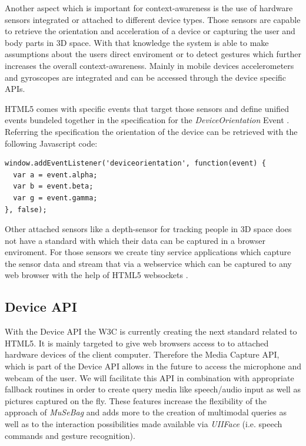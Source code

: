\documentclass[runningheads,a4paper]{llncs} \usepackage[utf8]{inputenc}
\begin{document}
Another aspect which is important for context-awareness is the use of
hardware sensors integrated or attached to different device types. 
Those sensors are capable to retrieve the orientation and
acceleration of a device or capturing the user and body parts in 3D space.
With that knowledge the system is able to make assumptions about the users
direct enviroment or to detect gestures which further increases the overall
context-awareness. 
Mainly in mobile devices accelerometers and gyroscopes are integrated and can be
accessed through the device specific APIs.

HTML5 comes with specific events that target those sensors and define unified
events bundeled together in the specification for the \emph{DeviceOrientation}
Event \cite{deviceOrientation}. Referring the specification the orientation of
the device can be retrieved with the following Javascript code:
\begin{lstlisting}
window.addEventListener('deviceorientation', function(event) {
  var a = event.alpha;
  var b = event.beta;
  var g = event.gamma;
}, false);
\end{lstlisting}

Other attached sensors like a depth-sensor for tracking people in 3D space
does not have a standard with which their data can be captured in a browser
enviroment. For those sensors we create tiny service applications which capture
the sensor data and stream that via a webservice which can be captured to any
web browser with the help of HTML5 websockets \cite{websockets}.

\subsection{Device API}

With the Device API \cite{deviceAPI} the W3C is currently creating the next
standard related to HTML5. It is mainly targeted to give web browsers access to
to attached hardware devices of the client computer. Therefore
the Media Capture API, which is part of the Device API allows in the future
to access the microphone and webcam of the user. 
We will facilitate this API in combination with appropriate fallback routines
in order to create query media like speech/audio input as well as pictures
captured on the fly. These features increase the flexibility of the approach of
\emph{MuSeBag} and adds more to the creation of multimodal queries as well as
to the interaction possibilities made available via \emph{UIIFace} (i.e. speech
commands and gesture recognition).
\end{document}
